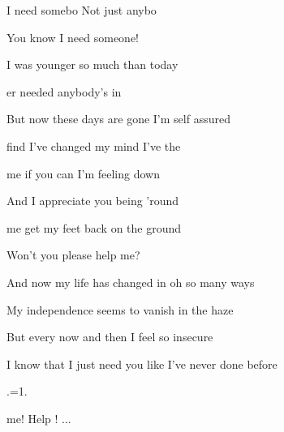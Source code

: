 

 I need somebo  Not just anybo

 You know I need someone! 

\zs
{} I was younger so much  than today

er needed anybody's  in  

But now these days are gone I'm  self assured

 find I've changed my mind I've   the 
\ks

\zr
{} me if you can I'm feeling down 

And I  appreciate you being 'round 

 me get my feet back on the ground

Won't you  please help me?
\kr

\zs
And now my life has changed in oh so many ways

My independence seems to vanish in the haze

But every now and then I feel so insecure

I know that I just need you like I've never done before
\ks

\zr  \kr

.=1.
\ks

\zr
{} me! Help ! ...
\kr

\kp





